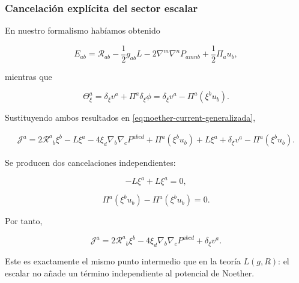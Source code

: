 \documentclass{beamer}
\newcommand{\Rcal}{\mathcal{R}}
\newcommand{\Eq}[1]{\eqref{#1}}
\begin{document}
\begin{frame}[label=nav-frame-084]
	\frametitle{Cancelación explícita del sector escalar}
	\scriptsize

	En nuestro formalismo habíamos obtenido

	\[
	E_{ab}
	=
	\Rcal_{ab}
	-\frac12g_{ab}L
	-2\nabla^m\nabla^nP_{amnb}
	+
	\frac12\Pi_a u_b,
	\]

	mientras que

	\[
	\Theta_\xi^a
	=
	\delta_\xi v^a
	+
	\Pi^a\delta_\xi\phi
	=
	\delta_\xi v^a
	-
	\Pi^a(\xi^bu_b).
	\]


	Sustituyendo ambos resultados en
	\Eq{eq:noether-current-generalizada},

	\[
	\begin{aligned}
		\mathcal J^a
		=
		2\Rcal^a{}_b\xi^b
		-
		L\xi^a
		-
		4\xi_d\nabla_b\nabla_cP^{abcd}
		+
		\Pi^a(\xi^bu_b)
		+
		L\xi^a
		+
		\delta_\xi v^a
		-
		\Pi^a(\xi^bu_b).
	\end{aligned}
	\]


	Se producen dos cancelaciones independientes:

	\[
	-L\xi^a+L\xi^a=0,
	\]

	\[
	\Pi^a(\xi^bu_b)-\Pi^a(\xi^bu_b)=0.
	\]

	Por tanto,

	\begin{equation}
		\boxed{
			\mathcal J^a
			=
			2\Rcal^a{}_b\xi^b
			-
			4\xi_d\nabla_b\nabla_cP^{abcd}
			+
			\delta_\xi v^a.
		}
		\label{eq:noether-generalizada-reducida}
	\end{equation}

	Este es exactamente el mismo punto intermedio que en la teoría
	\(L(g,R)\): el escalar no añade un término independiente al
	potencial de Noether.

\end{frame}
\end{document}
